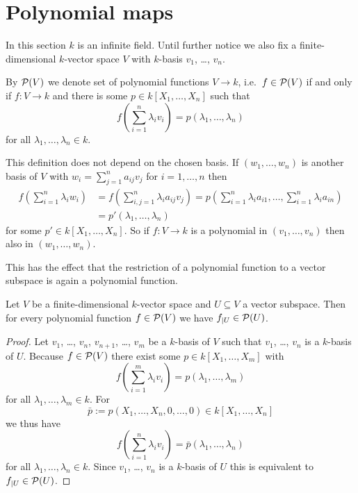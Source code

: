 




\section{Polynomial maps}


In this section $k$ is an infinite field. Until further notice we also fix a finite-dimensional $k$-vector space $V$ with $k$-basis $v_1$, \dots, $v_n$.


\begin{defi}
 By $\mathcal{P}(V)$ we denote set of polynomial functions $V \to k$, i.e.\ $f \in \mathcal{P}(V)$ if and only if $f \colon V \to k$ and there is some $p \in k[X_1, \dotsc, X_n]$ such that
 \[
  f\left( \sum_{i=1}^n \lambda_i v_i \right) = p(\lambda_1, \dotsc, \lambda_n)
 \]
 for all $\lambda_1, \dotsc, \lambda_n \in k$.
\end{defi}


This definition does not depend on the chosen basis. If $(w_1, \dotsc, w_n)$ is another basis of $V$ with $w_i = \sum_{j=1}^n a_{ij} v_j$ for $i = 1, \dotsc, n$ then
\begin{align*}
 f\left( \sum_{i=1}^n \lambda_i w_i \right)
 &= f\left( \sum_{i,j=1}^n \lambda_i a_{ij} v_j \right)
 = p\left( \sum_{i=1}^n \lambda_i a_{i1}, \dotsc, \sum_{i=1}^n \lambda_{i} a_{in} \right)\\
 &= p'(\lambda_1, \dotsc, \lambda_n)
\end{align*}
for some $p' \in k[X_1, \dotsc, X_n]$. So if $f \colon V \to k$ is a polynomial in $(v_1, \dotsc, v_n)$ then also in $(w_1, \dotsc, w_n)$.

This has the effect that the restriction of a polynomial function to a vector subspace is again a polynomial function.

\begin{lem}
 Let $V$ be a finite-dimensional $k$-vector space and $U \subseteq V$ a vector subspace. Then for every polynomial function $f \in \mathcal{P}(V)$ we have $f_{|U} \in \mathcal{P}(U)$.
\end{lem}
\begin{proof}
 Let $v_1$, \dots, $v_n$, $v_{n+1}$, \dots, $v_m$ be a $k$-basis of $V$ such that $v_1$, \dots, $v_n$ is a $k$-basis of $U$. Because $f \in \mathcal{P}(V)$ there exist some $p \in k[X_1, \dotsc, X_m]$ with
 \[
  f\left( \sum_{i=1}^m \lambda_i v_i \right) = p(\lambda_1, \dotsc, \lambda_m)
 \]
 for all $\lambda_1, \dotsc, \lambda_m \in k$. For
 \[
  \bar{p} := p(X_1, \dotsc, X_n, 0, \dotsc, 0) \in k[X_1, \dotsc, X_n]
 \]
 we thus have
 \[
  f\left( \sum_{i=1}^n \lambda_i v_i \right) = \bar{p}(\lambda_1, \dotsc, \lambda_n)
 \]
 for all $\lambda_1, \dotsc, \lambda_n \in k$. Since $v_1$, \dots, $v_n$ is a $k$-basis of $U$ this is equivalent to $f_{|U} \in \mathcal{P}(U)$.
\end{proof}


